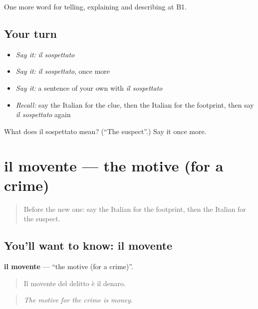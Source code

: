 \begin{grammarlens}[title={What you've built}]
One more word for telling, explaining and describing at B1.
\end{grammarlens}

\subsection*{Your turn}
\begin{itemize}
\raggedright
  \item \emph{Say it:} \emph{il sospettato}
  \item \emph{Say it:} \emph{il sospettato}, once more
  \item \emph{Say it:} a sentence of your own with \emph{il sospettato}
  \item \emph{Recall:} say the Italian for the clue, then the Italian for the footprint, then say \emph{il sospettato} again
\end{itemize}

\begin{tcolorbox}[breakable,colback=teal!4,colframe=teal!35!black,title={Before you move on}]
What does il sospettato mean? (\textquotedblleft{}The suspect\textquotedblright{}.) Say it once more.
\end{tcolorbox}
\section[il movente]{il movente — the motive (for a crime)}

\label{lesson:IT-C296-movente}



\begin{quote}
Before the new one: say the Italian for the footprint, then the Italian for the suspect.
\end{quote}

\subsection*{You'll want to know: il movente}
\textbf{il movente} — \textquotedblleft{}the motive (for a crime)\textquotedblright{}.

\begin{quote}
Il movente del delitto è il denaro.
\end{quote}

\begin{quote}
\emph{The motive for the crime is money.}
\end{quote}

